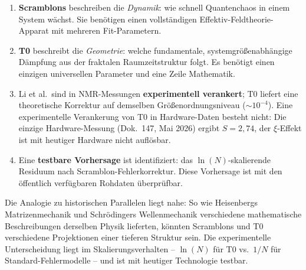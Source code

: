 \begin{enumerate}
	\item \textbf{Scramblons} beschreiben die \emph{Dynamik}: wie schnell Quantenchaos in einem System wächst. Sie benötigen einen vollständigen Effektiv-Feldtheorie-Apparat mit mehreren Fit-Parametern.
	
	\item \textbf{T0} beschreibt die \emph{Geometrie}: welche fundamentale, systemgrößenabhängige Dämpfung aus der fraktalen Raumzeitstruktur folgt. Es benötigt einen einzigen universellen Parameter und eine Zeile Mathematik.
	
	\item Li et al.\ sind in NMR-Messungen \textbf{experimentell verankert}; T0 liefert eine theoretische Korrektur auf demselben Größenordnungsniveau ($\sim 10^{-4}$). Eine experimentelle Verankerung von T0 in Hardware-Daten besteht nicht: Die einzige Hardware-Messung (Dok.~147, Mai 2026) ergibt $S = 2{,}74$, der $\xi$-Effekt ist mit heutiger Hardware nicht auflösbar.
	
	\item Eine \textbf{testbare Vorhersage} ist identifiziert: das $\ln(N)$-skalierende Residuum nach Scramblon-Fehlerkorrektur. Diese Vorhersage ist mit den öffentlich verfügbaren Rohdaten überprüfbar.
\end{enumerate}

Die Analogie zu historischen Parallelen liegt nahe: So wie Heisenbergs Matrizenmechanik und Schrödingers Wellenmechanik verschiedene mathematische Beschreibungen derselben Physik lieferten, könnten Scramblons und T0 verschiedene Projektionen einer tieferen Struktur sein. Die experimentelle Unterscheidung liegt im Skalierungsverhalten -- $\ln(N)$ für T0 vs.\ $1/N$ für Standard-Fehlermodelle -- und ist mit heutiger Technologie testbar.


